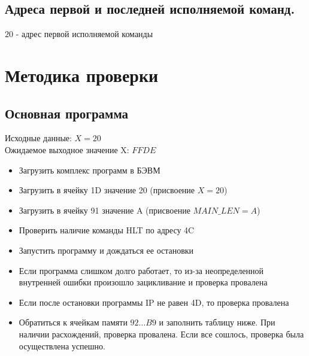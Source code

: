 \subsection{Адреса первой и последней исполняемой команд.}
\noindent $ 20 $ - адрес первой исполняемой команды\\

\newpage

\section{Методика проверки}
\subsection{Основная программа}
\noindent Исходные данные: $ X = 20 $\\
Ожидаемое выходное значение X: $ FFDE $\\
\begin{itemize}
	\item Загрузить комплекс программ в БЭВМ
	\item Загрузить в ячейку 1D значение 20 (присвоение $ X = 20 $)
	\item Загрузить в ячейку 91 значение A (присвоение $ MAIN\_LEN = A $)
	\item Проверить наличие команды HLT по адресу 4C
	\item Запустить программу и дождаться ее остановки
	\item Если программа слишком долго работает, то из-за неопределенной внутренней ошибки произошло зацикливание и проверка провалена
	\item Если после остановки программы IP не равен 4D, то проверка провалена
	\item Обратиться к ячейкам памяти $ 92\ldots B9 $ и заполнить таблицу ниже. При наличии расхождений, проверка провалена. Если все сошлось, проверка была осуществлена успешно.
\end{itemize}


